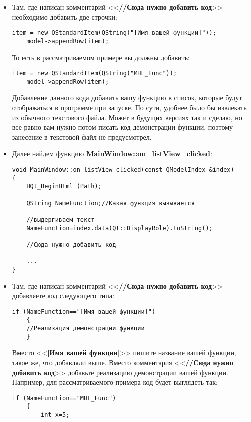 \begin{itemize}
\item Там, где написан комментарий <<\textbf{//Сюда нужно добавить код}>> необходимо добавить две строчки:
\begin{lstlisting}[label=examplefunction04, caption=Что добавить в mainwindow.cpp]
    item = new QStandardItem(QString("[Имя вашей функции]"));
    model->appendRow(item);
\end{lstlisting}
То есть в рассматриваемом примере вы должны добавить:
\begin{lstlisting}[label=examplefunction05, caption=Что добавить в mainwindow.cpp в примере]
    item = new QStandardItem(QString("MHL_Func"));
    model->appendRow(item);
\end{lstlisting}
Добавление данного кода добавить вашу функцию в список, которые будут отображаться в программе при запуске. По сути, удобнее было бы извлекать из обычного текстового файла. Может в будущих версиях так и сделаю, но все равно вам нужно потом писать код демонстрации функции, поэтому занесение в текстовой файл не предусмотрел.
\item Далее найдем функцию \textbf{MainWindow::on\_listView\_clicked}:
\begin{lstlisting}[label=examplefunction06, caption=MainWindow::on\_listView\_clicked]
void MainWindow::on_listView_clicked(const QModelIndex &index)
{
    HQt_BeginHtml (Path);

    QString NameFunction;//Какая функция вызывается

    //выдергиваем текст
    NameFunction=index.data(Qt::DisplayRole).toString();

    //Сюда нужно добавить код
	
	...
}
\end{lstlisting}
\item Там, где написан комментарий <<\textbf{//Сюда нужно добавить код}>> добавляете код следующего типа:
\begin{lstlisting}[label=examplefunction07, caption=Добавление демонстрации работы функции]
    if (NameFunction=="[Имя вашей функции]")
    {
	//Реализация демонстрации функции
    }
\end{lstlisting}
Вместо <<\textbf{[Имя вашей функции]}>> пишите название вашей функции, такое же, что добавляли выше. Вместо комментария <<\textbf{//Сюда нужно добавить код}>> добавьте реализацию демонстрации вашей функции. Например, для рассматриваемого примера код будет выглядеть так:
\begin{lstlisting}[label=examplefunction08, caption=Добавление демонстрации работы функции на примере]
    if (NameFunction=="MHL_Func")
    {
        int x=5;


\end{lstlisting}
\end{itemize}
